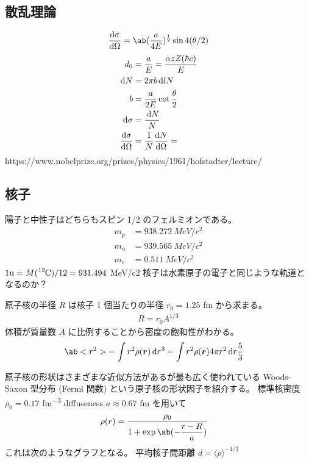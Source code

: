 \documentclass[uplatex,dvipdfmx,a4paper,11pt]{jlreq}
\newcommand{\rr}{\bm{r}}
\numberwithin{equation}{section}
\theoremstyle{definition}
\begin{document}
\subsection{散乱理論}
\begin{align}
  \diff{\sigma}{\Omega} = \ab(\frac{a}{4E})^{\frac{1}{2}}\sin4(\theta/2)
\end{align}
\begin{align}
  d_0                   & = \frac{a}{E} = \frac{\alpha z Z(\hbar c)}{E} \\
  \dl{N}                & = 2\pi b\dl{l}N                               \\
  b                     & = \frac{a}{2E}\cot\frac{\theta}{2}            \\
  \dl{\sigma}           & = \frac{\dl{N}}{N}                            \\
  \diff{\sigma}{\Omega} & = \frac{1}{N}\diff{N}{\Omega} =
\end{align}
https://www.nobelprize.org/prizes/physics/1961/hofstadter/lecture/

\subsection{核子}
陽子と中性子はどちらもスピン 1/2 のフェルミオンである。
\begin{align}
  m_p & = 938.272\ \si{MeV/c^2} \\
  m_n & = 939.565\ \si{MeV/c^2} \\
  m_e & = 0.511\ \si{MeV/c^2}
\end{align}
$1 \si{u} = M(\ce{^12C})/12 = 931.494$ \si{MeV/c2}
核子は水素原子の電子と同じような軌道となるのか？

原子核の半径 $R$ は核子 1 個当たりの半径 $r_0 = 1.25$ \si{fm} から求まる。
\begin{align}
  R = r_0A^{1/3}
\end{align}
体積が質量数 $A$ に比例することから密度の飽和性がわかる。
\begin{align}
  \ab<r^2> & = \int r^2\rho(\rr)\dl[3]{r} = \int r^2\rho(\rr)4\pi r^2\dl{r}
  \frac{5}{3}
\end{align}

原子核の形状はさまざまな近似方法があるが最も広く使われている Woods-Saxon 型分布 (Fermi 関数) という原子核の形状因子を紹介する。
標準核密度 $\rho_0 = 0.17$ \si{fm^{-3}} diffuseness $a \approx 0.67$ \si{fm} を用いて
\begin{align}
  \rho(r) & = \frac{\rho_0}{1 + \exp\ab(-\dfrac{r - R}{a})}
\end{align}
これは次のようなグラフとなる。
平均核子間距離 $d = \langle\rho\rangle^{-1/3}$
\end{document}

